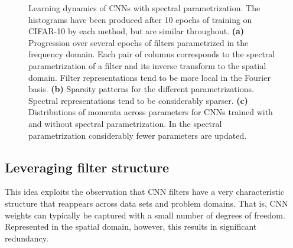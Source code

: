 \documentclass{article} %
\begin{document}
\begin{figure}[t]
\centering%
  \hfill
{}
  \hfill
{}
\caption{Learning dynamics of CNNs with spectral parametrization. The histograms have been produced after 10 epochs of training on CIFAR-10 by each method, but are similar throughout. {\bf (a)} Progression over several epochs of filters parametrized in the frequency domain. Each pair of columns corresponds to the spectral parametrization of a filter and its inverse transform to the spatial domain. Filter representations tend to be more local in the Fourier basis. {\bf (b)} Sparsity patterns for the different parametrizations. Spectral representations tend to be considerably sparser. {\bf (c)} Distributions of momenta across parameters for CNNs trained with and without spectral parametrization. In the spectral parametrization considerably fewer parameters are updated.}
\label{fig:learning_dynamics}
\end{figure}

\subsection{Leveraging filter structure}
This idea exploits the observation that CNN filters have a very characteristic structure that reappears across data sets and problem domains.  That is, CNN weights can typically be captured with a small number of degrees of freedom. Represented in the spatial domain, however, this results in significant redundancy. 
\end{document}
